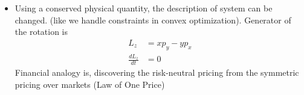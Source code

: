 \documentclass{article}
\begin{document}
\begin{description}
\begin{itemize}
\begin{equation*}
                    \end{equation*}
                    This formally shows that the generalized momentum $p_\phi = \frac{\partial L}{\partial \dot{\phi}}$ is exactly the conserved rotational quantity.
              \item Using a conserved physical quantity, the description of system can be changed. (like we handle constraints in convex optimization). Generator of the rotation is
                    \begin{align*}
                        L_z              & = x p_y - y p_x \\
                        \frac{d L_z}{dt} & = 0
                    \end{align*}
                    Financial analogy is, discovering the risk-neutral pricing from the symmetric pricing over markets (Law of One Price)
          \end{itemize}


\end{description}
\end{document}
